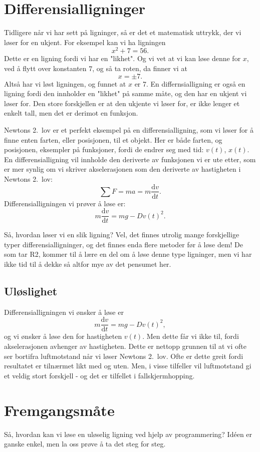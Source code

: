 \documentclass[a4paper, 11pt, notitlepage, english]{article}
\renewcommand{\d}{\text{d}}
\begin{document}
\section*{Differensialligninger}
Tidligere når vi har sett på ligninger, så er det et matematisk uttrykk, der vi løser for en ukjent. For eksempel kan vi ha ligningen
$$x^2 + 7 = 56.$$
Dette er en ligning fordi vi har en "likhet". Og vi vet at vi kan løse denne for $x$, ved å flytt over konstanten $7$, og så ta roten, da finner vi at 
$$x = \pm 7.$$
Altså har vi løst ligningen, og funnet at $x$ er 7. En differnsialligning er også en ligning fordi den innholder en "likhet" på samme måte, og den har en ukjent vi løser for. Den store forskjellen er at den ukjente vi løser for, er ikke lenger et enkelt tall, men det er derimot en funksjon.

Newtons 2.\ lov er et perfekt eksempel på en differensialligning, som vi løser for å finne enten farten, eller posisjonen, til et objekt. Her er både farten, og posisjonen, eksempler på funksjoner, fordi de endrer seg med tid: $v(t)$, $x(t)$. En differensialligning vil innholde den deriverte av funksjonen vi er ute etter, som er mer synlig om vi skriver akselerasjonen som den deriverte av hastigheten i Newtons 2.\ lov:
$$\sum F = ma = m\frac{\d v}{\d t}.$$
Differensialligningen vi prøver å løse er:
$$m\frac{\d v}{\d t} = mg - D v(t)^2.$$

Så, hvordan løser vi en slik ligning? Vel, det finnes utrolig mange forskjellige typer differensialligninger, og det finnes enda flere metoder før å løse dem! De som tar R2, kommer til å lære en del om å løse denne type ligninger, men vi har ikke tid til å dekke så altfor mye av det pensumet her.

\subsection*{Uløslighet}
Differensialligningen vi ønsker å løse er
$$m\frac{\d v}{\d t} = mg - D v(t)^2,$$
og vi ønsker å løse den for hastigheten $v(t)$. Men dette får vi ikke til, fordi akselerasjonen avhenger av hastigheten. Dette er nettopp grunnen til at vi ofte ser bortifra luftmotstand når vi løser Newtons 2.\ lov. Ofte er dette greit fordi resultatet er tilnærmet likt med og uten. Men, i visse tilfeller vil luftmotstand gi et veldig stort forskjell - og det er tilfellet i fallskjermhopping.

\section{Fremgangsmåte}
Så, hvordan kan vi løse en uløselig ligning ved hjelp av programmering? Idéen er ganske enkel, men la oss prøve å ta det steg for steg.
\end{document}
